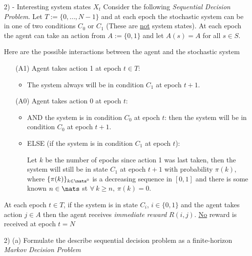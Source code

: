 \documentclass[11pt,a4paper]{article}
\begin{document}
\begin{question}{2) - Interesting system states $X_t$}
  Consider the following \textit{Sequential Decision Problem}. Let $T:=\{0,\dots,N-1\}$ and at each epoch the stochastic system can be in one of two conditions $C_0$ or $C_1$ (These are \underline{not} system states). At each epoch the agent can take an action from $A:=\{0,1\}$ and let $A(s)=A$ for all $s\in S$.
  \par Here are the possible interactions between the agent and the stochastic system
  \begin{itemize}
    \item[(A1)] Agent takes action 1 at epoch $t\in T$:
    \begin{itemize}
      \item The system always will be in condition $C_1$ at epoch $t+1$.
    \end{itemize}
    \item[(A0)] Agent takes action 0 at epoch $t$:
    \begin{itemize}
      \item AND the system is in condition $C_0$ at epoch $t$: then the system will be in condition $C_0$ at epoch $t+1$.
      \item ELSE (if the system is in condition $C_1$ at epoch $t$):
      \par Let $k$ be the number of epochs since action 1 was last taken, then the system will still be in state $C_1$ at epoch $t+1$ with probability $\pi(k)$, where $\{\pi(k)\}_{k\in\nats^0}$ is a decreasing sequence in $[0,1]$ and there is some known $n\in\nats$ st $\forall\ k\geq n,\ \pi(k)=0$.
    \end{itemize}
  \end{itemize}
  At each epoch $t\in T$, if the system is in state $C_i$, $i\in\{0,1\}$ and the agent takes action $j\in A$ then the agent receives \textit{immediate reward} $R(i,j)$. \underline{No} reward is received at epoch $t=N$
\end{question}

\begin{question}{2) (a)}
  Formulate the describe sequential decision problem as a finite-horizon \textit{Markov Decision Problem}
\end{question}
\end{document}
